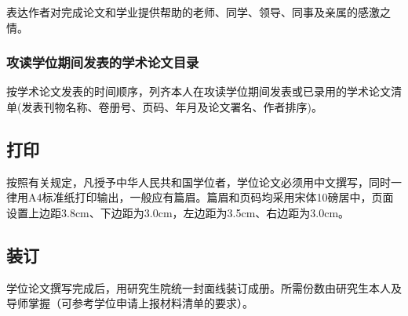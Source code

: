 表达作者对完成论文和学业提供帮助的老师、同学、领导、同事及亲属的感激之情。

\subsubsection{攻读学位期间发表的学术论文目录}

按学术论文发表的时间顺序，列齐本人在攻读学位期间发表或已录用的学术论文清单(发表刊物名称、卷册号、页码、年月及论文署名、作者排序)。

\subsection{打印}

按照有关规定，凡授予中华人民共和国学位者，学位论文必须用中文撰写，同时一律用A4标准纸打印输出，一般应有篇眉。篇眉和页码均采用宋体10磅居中，页面设置上边距3.8cm、下边距为3.0cm，左边距为3.5cm、右边距为3.0cm。

\subsection{装订}

学位论文撰写完成后，用研究生院统一封面线装订成册。所需份数由研究生本人及导师掌握（可参考学位申请上报材料清单的要求）。
